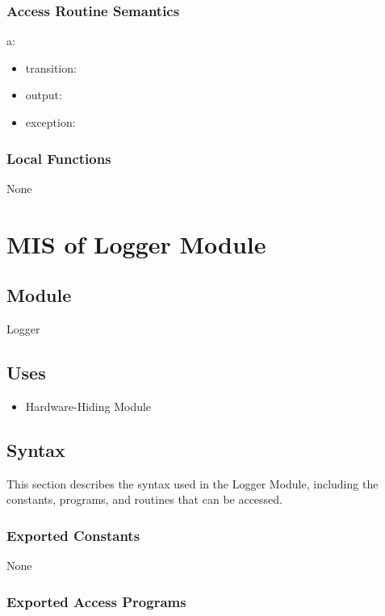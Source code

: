 \documentclass[12pt, titlepage]{article}
\begin{document}
\subsubsection{Access Routine Semantics}

\noindent a:
\begin{itemize}
\item transition: 
\item output: 
\item exception: 
\end{itemize}

\subsubsection{Local Functions}

None

\newpage

\section{MIS of Logger Module} \label{MIS_Logger}

\subsection{Module}

Logger

\subsection{Uses}

\begin{itemize}
\item Hardware-Hiding Module
\end{itemize}

\subsection{Syntax}

This section describes the syntax used in the Logger Module, including the
constants, programs, and routines that can be accessed.

\subsubsection{Exported Constants}

None

\subsubsection{Exported Access Programs}
\end{document}
